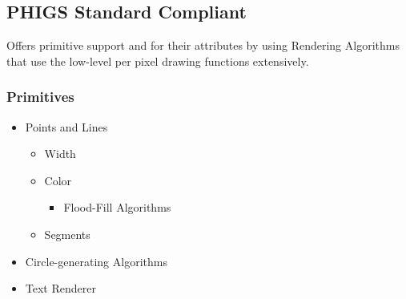 
        \subsection*{PHIGS Standard Compliant}
            Offers primitive support and for their attributes by using Rendering Algorithms that use the low-level per pixel drawing functions extensively.

            \subsubsection*{Primitives}
                \begin{itemize}
                  \item Points and Lines
                  \begin{itemize}
                    \item Width
                    \item Color
                    \begin{itemize}
                      \item Flood-Fill Algorithms
                    \end{itemize}
                    \item Segments
                  \end{itemize}
                  \item Circle-generating Algorithms
                  \item Text Renderer
                \end{itemize}

